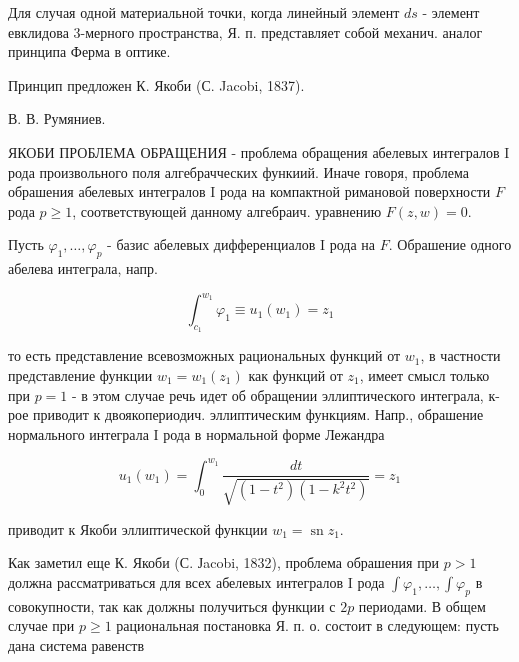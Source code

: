 \documentclass[10pt]{article}
\begin{document}
Для случая одной материальной точки, когда линейный элемент $d s$ - элемент евклидова 3-мерного пространства, Я. п. представляет собой механич. аналог принципа Ферма в оптике.



Принцип предложен К. Якоби (С. Jacobi, 1837).



В. В. Румяниев.



ЯКОБИ ПРОБЛЕМА ОБРАЩЕНИЯ - проблема обращения абелевых интегралов I рода произвольного поля алгебрачческих функиий. Иначе говоря, проблема обрашения абелевых интегралов I рода на компактной римановой поверхности $F$ рода $p \geqslant 1$, соответствующей данному алгебраич. уравнению $F(z, w)=0$.



Пусть $\varphi_{1}, \ldots, \varphi_{p}$ - базис абелевых дифференциалов I рода на $F$. Обрашение одного абелева интеграла, напр.



\[

\int_{c_{1}}^{w_{1}} \varphi_{1} \equiv u_{1}\left(w_{1}\right)=z_{1}

\]



то есть представление всевозможных рациональных функций от $w_{1}$, в частности представление функции $w_{1}=w_{1}\left(z_{1}\right)$ как функций от $z_{1}$, имеет смысл только при $p=1$ - в этом случае речь идет об обращении эллиптического интеграла, к-рое приводит к двоякопериодич. эллиптическим функциям. Напр., обрашение нормального интеграла I рода в нормальной форме Лежандра



\[

u_{1}\left(w_{1}\right)=\int_{0}^{w_{1}} \frac{d t}{\sqrt{\left(1-t^{2}\right)\left(1-k^{2} t^{2}\right)}}=z_{1}

\]



приводит к Якоби эллиптической функции $w_{1}=\operatorname{sn} z_{1}$.



Как заметил еще К. Якоби (С. Јacobi, 1832), проблема обрашения при $p>1$ должна рассматриваться для всех абелевых интегралов I рода $\int \varphi_{1}, \ldots, \int \varphi_{p}$ в совокупности, так как должны получиться функции с $2 p$ периодами. В общем случае при $p \geqslant 1$ рациональная постановка Я. п. о. состоит в следующем: пусть дана система равенств
\end{document}
